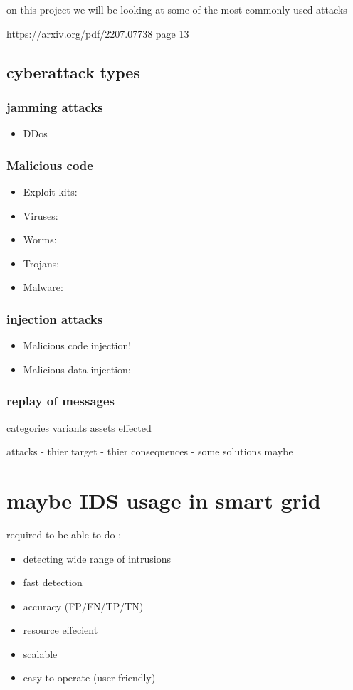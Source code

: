 on this project we will be looking at some of the most commonly used attacks

https://arxiv.org/pdf/2207.07738 page 13
\subsection{cyberattack types}
\subsubsection{jamming attacks}
\begin{itemize}
	\item DDos
\end{itemize}

\subsubsection{Malicious code}
\begin{itemize}
	\item Exploit kits:
	\item Viruses:
	\item Worms:
	\item Trojans:
	\item Malware:
\end{itemize}

\subsubsection{injection attacks}
\begin{itemize}
	\item Malicious code injection!
	\item Malicious data injection:
\end{itemize}

\subsubsection{replay of messages}


categories
	variants
	assets effected

attacks - thier target - thier consequences - some solutions maybe




\section{maybe IDS usage in smart grid}
required to be able to do :

\firmlist
\begin{itemize}
	\item detecting wide range of intrusions
	\item fast detection
	\item accuracy (FP/FN/TP/TN)
	\item resource effecient
	\item scalable
	\item easy to operate (user friendly)
\end{itemize}


